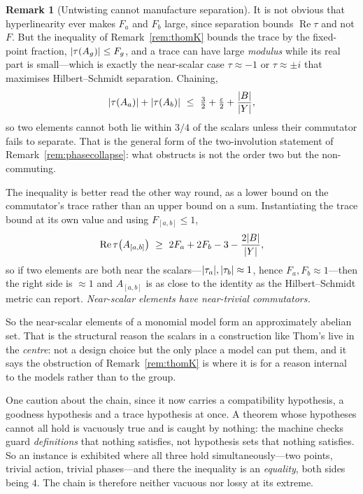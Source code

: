 \documentclass[11pt]{amsart}
\theoremstyle{definition}
\newtheorem{remark}[theorem]{Remark}
\theoremstyle{plain}
\newcommand{\eps}{\varepsilon}
\DeclarePairedDelimiter{\abs}{\lvert}{\rvert}
\begin{document}
\begin{remark}[Untwisting cannot manufacture separation]
It is not obvious that hyperlinearity ever makes \(F_a\) and \(F_b\) large, since separation bounds \(\operatorname{Re}\tau\) and not \(F\).  But the inequality of Remark~\ref{rem:thomK} bounds the trace by the fixed-point fraction, \(\abs{\tau(A_g)}\leq F_g\), and a trace can have large \emph{modulus} while its real part is small---which is exactly the near-scalar case \(\tau\approx-1\) or \(\tau\approx\pm i\) that maximises Hilbert--Schmidt separation.  Chaining,
\[
 \abs{\tau(A_a)}+\abs{\tau(A_b)}\ \leq\ \tfrac32+\tfrac\eps2+\frac{\abs B}{\abs Y},
\]
so two elements cannot both lie within \(3/4\) of the scalars unless their commutator fails to separate.  That is the general form of the two-involution statement of Remark~\ref{rem:phasecollapse}: what obstructs is not the order two but the non-commuting.

The inequality is better read the other way round, as a lower bound on the commutator's trace rather than an upper bound on a sum.  Instantiating the trace bound at its own value and using \(F_{[a,b]}\leq1\),
\[
 \operatorname{Re}\tau\bigl(A_{[a,b]}\bigr)\ \geq\ 2F_a+2F_b-3-\frac{2\abs B}{\abs Y},
\]
so if two elements are both near the scalars---\(\abs{\tau_a},\abs{\tau_b}\approx1\), hence \(F_a,F_b\approx1\)---then the right side is \(\approx1\) and \(A_{[a,b]}\) is as close to the identity as the Hilbert--Schmidt metric can report.  \emph{Near-scalar elements have near-trivial commutators.}

So the near-scalar elements of a monomial model form an approximately abelian set.  That is the structural reason the scalars in a construction like Thom's live in the \emph{centre}: not a design choice but the only place a model can put them, and it says the obstruction of Remark~\ref{rem:thomK} is where it is for a reason internal to the models rather than to the group.

One caution about the chain, since it now carries a compatibility hypothesis, a goodness hypothesis and a trace hypothesis at once.  A theorem whose hypotheses cannot all hold is vacuously true and is caught by nothing: the machine checks guard \emph{definitions} that nothing satisfies, not hypothesis sets that nothing satisfies.  So an instance is exhibited where all three hold simultaneously---two points, trivial action, trivial phases---and there the inequality is an \emph{equality}, both sides being \(4\).  The chain is therefore neither vacuous nor lossy at its extreme.


\end{remark}
\end{document}
